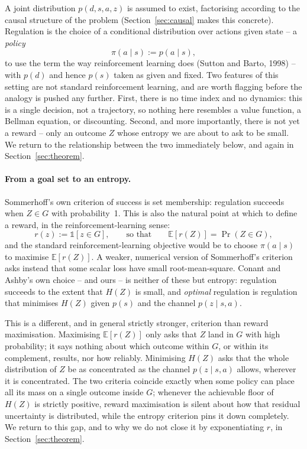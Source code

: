 \documentclass[11pt]{article}
\theoremstyle{definition}
\theoremstyle{remark}
\begin{document}
A joint distribution $p(d,s,a,z)$ is assumed to exist, factorising
according to the causal structure of the problem (Section~\ref{sec:causal}
makes this concrete). Regulation is the choice of a conditional
distribution over actions given state -- a \emph{policy}
\[
\pi(a\mid s) := p(a\mid s),
\]
to use the term the way reinforcement learning does (Sutton and Barto,
1998) -- with $p(d)$ and hence $p(s)$ taken as given and fixed. Two
features of this setting are not standard reinforcement learning, and are
worth flagging before the analogy is pushed any further. First, there is
no time index and no dynamics: this is a single decision, not a
trajectory, so nothing here resembles a value function, a Bellman
equation, or discounting. Second, and more importantly, there is not yet a
reward -- only an outcome $Z$ whose entropy we are about to ask to be
small. We return to the relationship between the two immediately below,
and again in Section~\ref{sec:theorem}.

\paragraph{From a goal set to an entropy.} Sommerhoff's own criterion of
success is set membership: regulation succeeds when $Z\in G$ with
probability~1. This is also the natural point at which to define a
reward, in the reinforcement-learning sense:
\[
r(z) := \mathbb{1}[z\in G], \qquad\text{so that}\qquad \mathbb{E}[r(Z)] = \Pr(Z\in G),
\]
and the standard reinforcement-learning objective would be to choose
$\pi(a\mid s)$ to maximise $\mathbb{E}[r(Z)]$. A weaker, numerical version
of Sommerhoff's criterion asks instead that some scalar loss have small
root-mean-square. Conant and Ashby's own choice -- and ours -- is neither
of these but entropy: regulation succeeds to the extent that $H(Z)$ is
small, and \emph{optimal} regulation is regulation that minimises $H(Z)$
given $p(s)$ and the channel $p(z\mid s,a)$.

This is a different, and in general strictly stronger, criterion than
reward maximisation. Maximising $\mathbb{E}[r(Z)]$ only asks that $Z$ land
in $G$ with high probability; it says nothing about which outcome within
$G$, or within its complement, results, nor how reliably. Minimising
$H(Z)$ asks that the whole distribution of $Z$ be as concentrated as the
channel $p(z\mid s,a)$ allows, wherever it is concentrated. The two
criteria coincide exactly when some policy can place all its mass on a
single outcome inside $G$; whenever the achievable floor of $H(Z)$ is
strictly positive, reward maximisation is silent about how that residual
uncertainty is distributed, while the entropy criterion pins it down
completely. We return to this gap, and to why we do not close it by
exponentiating $r$, in Section~\ref{sec:theorem}.
\end{document}
